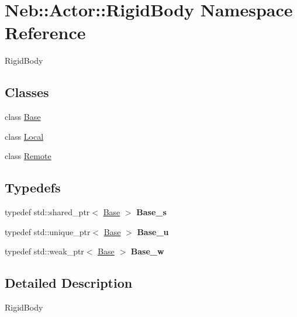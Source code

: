 \hypertarget{namespaceNeb_1_1Actor_1_1RigidBody}{\section{Neb\-:\-:Actor\-:\-:Rigid\-Body Namespace Reference}
\label{namespaceNeb_1_1Actor_1_1RigidBody}
}


Rigid\-Body  


\subsection*{Classes}
\begin{DoxyCompactItemize}
\item 
class \hyperlink{classNeb_1_1Actor_1_1RigidBody_1_1Base}{Base}
\item 
class \hyperlink{classNeb_1_1Actor_1_1RigidBody_1_1Local}{Local}
\item 
class \hyperlink{classNeb_1_1Actor_1_1RigidBody_1_1Remote}{Remote}
\end{DoxyCompactItemize}
\subsection*{Typedefs}
\begin{DoxyCompactItemize}
\item 
\hypertarget{namespaceNeb_1_1Actor_1_1RigidBody_a953c70038630d58e65077d3129d0ccbe}{typedef std\-::shared\-\_\-ptr$<$ \hyperlink{classNeb_1_1Actor_1_1RigidBody_1_1Base}{Base} $>$ {\bfseries Base\-\_\-s}}\label{namespaceNeb_1_1Actor_1_1RigidBody_a953c70038630d58e65077d3129d0ccbe}

\item 
\hypertarget{namespaceNeb_1_1Actor_1_1RigidBody_ad44e92c9f8ea33e83fdbef15aa986abc}{typedef std\-::unique\-\_\-ptr$<$ \hyperlink{classNeb_1_1Actor_1_1RigidBody_1_1Base}{Base} $>$ {\bfseries Base\-\_\-u}}\label{namespaceNeb_1_1Actor_1_1RigidBody_ad44e92c9f8ea33e83fdbef15aa986abc}

\item 
\hypertarget{namespaceNeb_1_1Actor_1_1RigidBody_a07d096148943a9bb0bcb238b566ff2f3}{typedef std\-::weak\-\_\-ptr$<$ \hyperlink{classNeb_1_1Actor_1_1RigidBody_1_1Base}{Base} $>$ {\bfseries Base\-\_\-w}}\label{namespaceNeb_1_1Actor_1_1RigidBody_a07d096148943a9bb0bcb238b566ff2f3}

\end{DoxyCompactItemize}


\subsection{Detailed Description}
Rigid\-Body 
